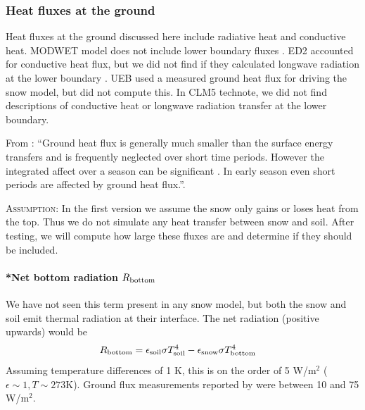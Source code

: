 \documentclass[twoside,10pt]{report}
\begin{document}
\subsubsection{Heat fluxes at the ground}

Heat fluxes at the ground discussed here include radiative heat and conductive heat. MODWET model does not include lower boundary fluxes \citep{Margulis}. ED2 accounted for conductive heat flux, but we did not find if they calculated longwave radiation at the lower boundary \citep{Walko00a}. UEB used a measured ground heat flux for driving the snow model, but did not compute this\citep{TarbotonLuce}. In CLM5 technote, we did not find descriptions of conductive heat or longwave radiation transfer at the lower boundary.

From \citet{TarbotonLuce}: ``Ground heat flux is generally much smaller than the surface energy transfers \citep{bras1990hydrology} and is frequently neglected over short time periods. However the integrated affect over a season can be significant \citep{Male_Gray_1981}. In early season even short periods are affected by ground heat flux.''.
\begin{framed}
\textsc{Assumption:} In the first version we assume the snow only gains or loses heat from the top. Thus we do not simulate any heat transfer between snow and soil. After testing, we will compute how large these fluxes are and determine if they should be included.
\end{framed}

\paragraph{*Net bottom radiation $R_{\rm bottom}$}
We have not seen this term present in any snow model, but both the snow and soil emit thermal radiation at their interface. The net radiation (positive upwards) would be
\begin{align}
    R_{\rm bottom} &= \epsilon_{\rm soil} \sigma T_{\rm soil}^4- \epsilon_{\rm snow} \sigma T_{\rm bottom}^4
\end{align}
Assuming temperature differences of 1 K, this is on the order of 5 W/m$^2$ ($\epsilon \sim 1, T\sim 273$K). Ground flux measurements reported by \citet{UNM_report} were between 10 and 75 W/m$^2$.
\end{document}
